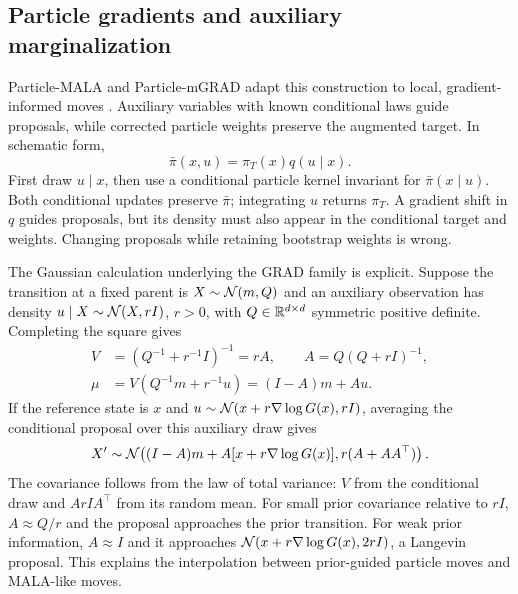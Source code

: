 \subsection{Particle gradients and auxiliary marginalization}

Particle-MALA and Particle-mGRAD adapt this construction to local,
gradient-informed moves \citep[Algorithms 3--7]{corenflos2024particlemala}.
Auxiliary variables with known conditional laws guide proposals, while
corrected particle weights preserve the augmented target. In schematic form,
\begin{equation}
 \bar\pi(x,u)=\pi_T(x)q(u\mid x).
 \label{eq:bf-modern-particle-auxiliary}
\end{equation}
First draw $u\mid x$, then use a conditional particle kernel invariant for
$\bar\pi(x\mid u)$. Both conditional updates preserve $\bar\pi$;
integrating $u$ returns $\pi_T$. A gradient shift in $q$ guides proposals,
but its density must also appear in the conditional target and weights.
Changing proposals while retaining bootstrap weights is wrong.

The Gaussian calculation underlying the GRAD family is explicit. Suppose
the transition at a fixed parent is $X\sim\mathcal{N}(m,Q)$ and an auxiliary
observation has density $u\mid X\sim\mathcal{N}(X,rI)$, $r>0$, with
$Q\in\mathbb{R}^{d\times d}$ symmetric positive definite. Completing the
square gives
\begin{align}
 V&=(Q^{-1}+r^{-1}I)^{-1}=rA,\qquad A=Q(Q+rI)^{-1},\\
 \mu&=V(Q^{-1}m+r^{-1}u)=(I-A)m+Au.
 \label{eq:bf-modern-grad-gaussian-product}
\end{align}
If the reference state is $x$ and
$u\sim\mathcal{N}(x+r\nabla\log G(x),rI)$, averaging the conditional proposal
over this auxiliary draw gives
\begin{equation}
 X'\sim\mathcal{N}\!\left((I-A)m+A[x+r\nabla\log G(x)],
                            r(A+AA^\top)\right).
 \label{eq:bf-modern-grad-marginal-proposal}
\end{equation}
The covariance follows from the law of total variance: $V$ from the
conditional draw and $ArIA^\top$ from its random mean. For small prior
covariance relative to $rI$, $A\approx Q/r$ and the proposal approaches the
prior transition. For weak prior information, $A\approx I$ and it approaches
$\mathcal{N}(x+r\nabla\log G(x),2rI)$, a Langevin proposal. This explains the
interpolation between prior-guided particle moves and MALA-like moves.

